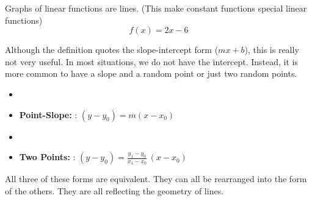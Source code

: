 \documentclass{ximera}
\begin{document}
Graphs of linear functions are lines. 
(This make constant functions special linear functions)
\[ f(x) = 2x - 6\]





\begin{image}
\end{image}






Although the definition quotes the slope-intercept form ($m x + b$), this is really not very useful.  In most situations, we do not have the intercept.  Instead, it is more common to have a slope and a random point or just two random points.



\begin{itemize}

\item \item \textbf{\textcolor{blue!55!black}{Point-Slope:}}  : $(y - y_0) = m (x - x_0)$

\item \item \textbf{\textcolor{blue!55!black}{Two Points:}}  : $(y - y_0) = \frac{y_1 - y_0}{x_1 - x_0} \, (x - x_0)$

\end{itemize}


All three of these forms are equivalent.  They can all be rearranged into the form of the others.  They are all reflecting the geometry of lines.  
\end{document}
